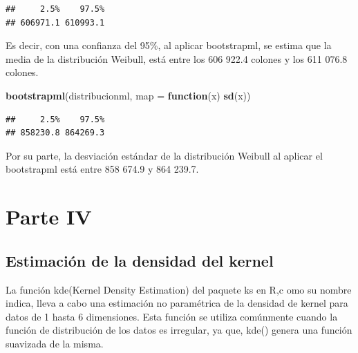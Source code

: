 \documentclass[
]{article}
\newenvironment{Shaded}{\begin{snugshade}}{\end{snugshade}}
\newcommand{\AttributeTok}[1]{\textcolor[rgb]{0.13,0.29,0.53}{#1}}
\newcommand{\ControlFlowTok}[1]{\textcolor[rgb]{0.13,0.29,0.53}{\textbf{#1}}}
\newcommand{\DecValTok}[1]{\textcolor[rgb]{0.00,0.00,0.81}{#1}}
\newcommand{\FloatTok}[1]{\textcolor[rgb]{0.00,0.00,0.81}{#1}}
\newcommand{\FunctionTok}[1]{\textcolor[rgb]{0.13,0.29,0.53}{\textbf{#1}}}
\newcommand{\NormalTok}[1]{#1}
\newcommand{\SpecialCharTok}[1]{\textcolor[rgb]{0.81,0.36,0.00}{\textbf{#1}}}
\newcommand{\StringTok}[1]{\textcolor[rgb]{0.31,0.60,0.02}{#1}}
\begin{document}
\begin{verbatim}
##     2.5%    97.5% 
## 606971.1 610993.1
\end{verbatim}

Es decir, con una confianza del 95\%, al aplicar bootstrapml, se estima
que la media de la distribución Weibull, está entre los 606 922.4
colones y los 611 076.8 colones.

\begin{Shaded}
\begin{Highlighting}[]
\FunctionTok{bootstrapml}\NormalTok{(distribucionml, }
            \AttributeTok{map =} \ControlFlowTok{function}\NormalTok{(x) }\FunctionTok{sd}\NormalTok{(x))}
\end{Highlighting}
\end{Shaded}

\begin{verbatim}
##     2.5%    97.5% 
## 858230.8 864269.3
\end{verbatim}

Por su parte, la desviación estándar de la distribución Weibull al
aplicar el bootstrapml está entre 858 674.9 y 864 239.7.

\hypertarget{parte-iv}{%
\section{Parte IV}\label{parte-iv}}

\hypertarget{estimaciuxf3n-de-la-densidad-del-kernel}{%
\subsection{Estimación de la densidad del
kernel}\label{estimaciuxf3n-de-la-densidad-del-kernel}}

La función kde(Kernel Density Estimation) del paquete ks en R,c omo su
nombre indica, lleva a cabo una estimación no paramétrica de la densidad
de kernel para datos de 1 hasta 6 dimensiones. Esta función se utiliza
comúnmente cuando la función de distribución de los datos es irregular,
ya que, kde() genera una función suavizada de la misma.

\begin{Shaded}
\end{Shaded}
\end{document}
